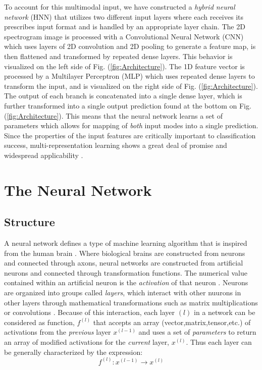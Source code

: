 \documentclass[conference,onecolumn,letterpaper]{IEEEtran}
\begin{document}
To account for this multimodal input, we have constructed a \textit{hybrid neural network} (HNN) that utilizes two different input layers where each receives its prescribes input format and is handled by an appropriate layer chain. The 2D spectrogram image is processed with a Convolutional Neural Network (CNN) which uses layers of 2D convolution and 2D pooling to generate a feature map, is then flattened and transformed by repeated dense layers. This behavior is visualized on the left side of Fig. (\ref{fig:Architecture}). The 1D feature vector is processed by a Multilayer Perceptron (MLP) which uses repeated dense layers to transform the input, and is visualized on the right side of Fig. (\ref{fig:Architecture}). The output of each branch is concatenated into a single dense layer, which is further transformed into a single output prediction found at the bottom on Fig. (\ref{fig:Architecture}). This means that the neural network learns a set of parameters which allows for mapping of \textit{both} input modes into a single prediction. Since the properties of the input features are critically important to classification success, multi-representation learning shows a great deal of promise and widespread applicability \cite{Khan,Li,Liu,Virtanen}. 


\section{The Neural Network}
\label{sec:NeuralNetwork}


\subsection{Structure}
\label{subsec:structure}

A neural network defines a type of machine learning algorithm that is inspired from the human brain \cite{Geron,Goodfellow}. Where biological brains are constructed from neurons and connected through axons, neural networks are constructed from artificial neurons and connected through transformation functions. The numerical value contained within an artificial neuron is the \textit{activation} of that neuron \cite{Levine}. Neurons are organized into groups called \textit{layers}, which interact with other nuurons in other layers through mathematical transformations such as matrix multiplications or convolutions \cite{Goodfellow}. Because of this interaction, each layer $(l)$ in a network can be considered as function, $f^{(l)}$ that accepts an array (vector,matrix,tensor,etc.) of activations from the \textit{previous} layer $x^{(l-1)}$ and uses a set of \textit{parameters} to return an array of modified activations for the \textit{current} layer, $x^{(l)}$. Thus each layer can be generally characterized by the expression:
\begin{equation}
    \label{eqn:LayerFunction}
    f^{(l)} : x^{(l-1)} \rightarrow x^{(l)}
\end{equation}
\end{document}
